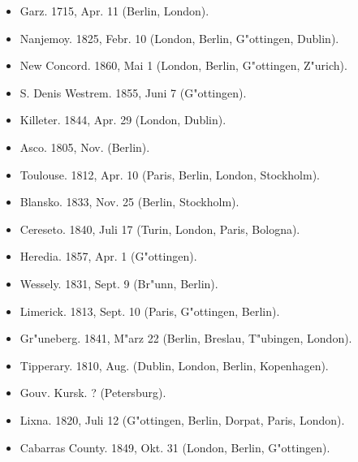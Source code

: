 \documentclass[a4paper, 11pt, oneside]{article}
\begin{document}
\begin{itemize}
\begin{itemize}
\begin{itemize}
            \item Garz. 1715, Apr. 11 (Berlin, London).
        
            \item Nanjemoy. 1825, Febr. 10 (London, Berlin, G"ottingen, Dublin).
        
            \item New Concord. 1860, Mai 1 (London, Berlin, G"ottingen, Z"urich).
        
            \item S. Denis Westrem. 1855, Juni 7 (G"ottingen).
        
            \item Killeter. 1844, Apr. 29 (London, Dublin).
        
            \item Asco. 1805, Nov. (Berlin).
        
            \item Toulouse. 1812, Apr. 10 (Paris, Berlin, London, Stockholm).
        
            \item Blansko. 1833, Nov. 25 (Berlin, Stockholm).
        
            \item Cereseto. 1840, Juli 17 (Turin, London, Paris, Bologna).
        
            \item Heredia. 1857, Apr. 1 (G"ottingen).
        
            \item Wessely. 1831, Sept. 9 (Br"unn, Berlin).
        
            \item Limerick. 1813, Sept. 10 (Paris, G"ottingen, Berlin).
        
            \item Gr"uneberg. 1841, M"arz 22 (Berlin, Breslau, T"ubingen, London).
        
            \item Tipperary. 1810, Aug. (Dublin, London, Berlin, Kopenhagen).
        
            \item Gouv. Kursk. ? (Petersburg). 
        
            \item Lixna. 1820, Juli 12 (G"ottingen, Berlin, Dorpat, Paris, London).
        
            \item Cabarras County. 1849, Okt. 31 (London, Berlin, G"ottingen).
        

\end{itemize}
\end{itemize}
\end{itemize}
\end{document}
